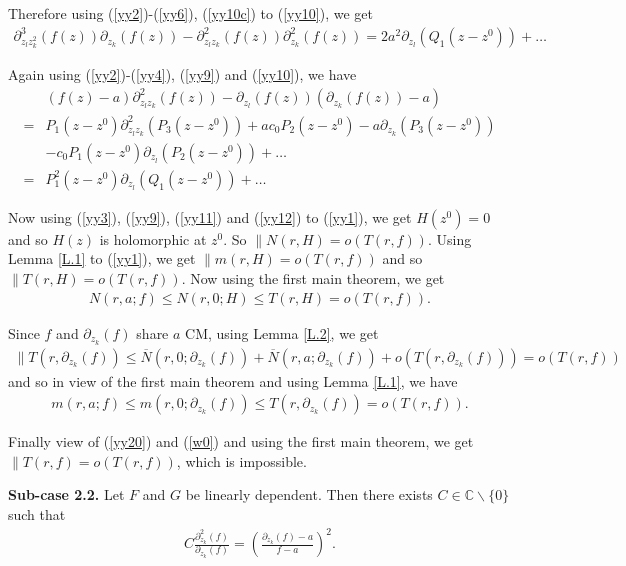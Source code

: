 \documentclass[11pt, reqno]{amsart}
\newcommand{\ol}{\overline}
\numberwithin{equation}{section}
\begin{document}
Therefore using (\ref{yy2})-(\ref{yy6}), (\ref{yy10c}) to (\ref{yy10}), we get
\begin{align}\label{yy11} 
\partial^3_{z_l z_k^2}(f(z))\partial_{z_k}(f(z))-\partial^2_{z_lz_k}(f(z))\partial_{z_k}^2(f(z))=
2a^2\partial_{z_l}(Q_1(z-z^0))+\ldots
\end{align}

Again using (\ref{yy2})-(\ref{yy4}), (\ref{yy9}) and (\ref{yy10}), we have
\begin{align}\label{yy12} &(f(z)-a)\partial_{z_lz_k}^2(f(z))-\partial_{z_l}(f(z))(\partial_{z_k}(f(z))-a)\\=&P_1(z-z^0)\partial_{z_lz_k}^2(P_3(z-z^0))+ac_0P_2(z-z^0)-a\partial_{z_k}(P_3(z-z^0))\nonumber\\&-c_0P_1(z-z^0)\partial_{z_l}(P_2(z-z^0))+\ldots\nonumber\\=&
P_1^2(z-z^0)\partial_{z_l}(Q_1(z-z^0))+\ldots\nonumber
\end{align}

Now using (\ref{yy3}), (\ref{yy9}), (\ref{yy11}) and (\ref{yy12}) to (\ref{yy1}), we get  
$H(z^0)=0$ and so $H(z)$ is holomorphic at $z^0$. So $\parallel N(r,H)=o(T(r,f))$. Using Lemma \ref{L.1} to (\ref{yy1}), we get $\parallel m(r,H)=o(T(r,f))$ and so $\parallel T(r,H)=o(T(r,f))$. Now using the first main theorem, we get
\begin{align}\label{yy20} 
N(r,a;f)\leq N(r,0;H)\leq T(r,H)=o(T(r,f)).
\end{align}

Since $f$ and $\partial_{z_k}(f)$ share $a$ CM, using Lemma \ref{L.2}, we get
\begin{align*} \parallel T(r,\partial_{z_k}(f))\leq \ol N(r,0;\partial_{z_k}(f))+\ol N(r,a;\partial_{z_k}(f))+o(T(r,\partial_{z_k}(f)))=o(T(r,f))
\end{align*}
and so in view of the first main theorem and using Lemma \ref{L.1}, we have
\begin{align}\label{w0} 
m(r,a;f)\leq m(r,0;\partial_{z_k}(f))\leq T(r,\partial_{z_k}(f))=o(T(r,f)).
\end{align}

Finally view of (\ref{yy20}) and (\ref{w0}) and using the first main theorem, we get $\parallel T(r,f)=o(T(r,f))$, which is impossible.\vspace{1.2mm}

{\bf Sub-case 2.2.} Let $F$ and $G$ be linearly dependent. Then there exists $C\in\mathbb{C}\backslash \{0\}$ such that
\begin{align}\label{w1} 
C\frac{\partial_{z_k}^2(f)}{\partial_{z_k}(f)}=\left(\frac{\partial_{z_k}(f)-a}{f-a}\right)^2.
\end{align}
\end{document}
